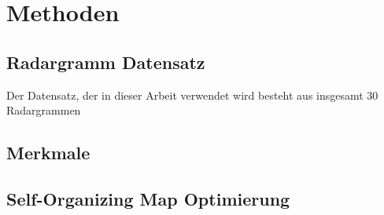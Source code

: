 \section{Methoden}

\subsection{Radargramm Datensatz}
Der Datensatz, der in dieser Arbeit verwendet wird besteht aus insgesamt 30 Radargrammen

\subsection{Merkmale}
\lipsum[1-8]

\subsection{Self-Organizing Map Optimierung}
\lipsum[1-5]